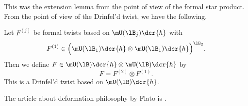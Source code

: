 This was the extension lemma from the point of view of the formal star product. From the point of view of the Drinfel'd twist, we have the following.

\begin{proposition}
	Let $F^{(j)}$ be formal twists based on $\mU(\lB_j)\dcr{h}$ with
	\begin{equation}
		F^{(1)}\in\Big( \mU(\lB_1)\dcr{h}\otimes\mU(\lB_1)\dcr{h} \Big)^{\lB_2}.
	\end{equation}
	Then we define $F\in\mU(\lB)\dcr{h}\otimes\mU(\lB)\dcr{h}$ by
	\begin{equation}
		F=F^{(2)}\otimes F^{(1)}.
	\end{equation}
	This is a Drinfel'd twist based on $\mU(\lB)\dcr{h}$.
\end{proposition}
The article about deformation philosophy by Flato is \cite{FlatoDeforView}.


